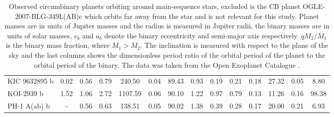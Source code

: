 \documentclass[twoside,openright,titlepage,numbers=noenddot,headinclude,%
                footinclude=true,cleardoublepage=empty,abstractoff, 
                BCOR=5mm,paper=a4,fontsize=11pt,%
                american,%
                ]{scrreprt}%
\begin{document}
\begin{table}
\begin{tabular}{lccccccccccccc}
    KIC 9632895 b    &  0.02 &  0.56 &  0.79 &   240.50 &  0.04 &  89.43 &    0.93 &    0.19 &  0.21 &      0.18 &     27.32 &      0.05 &       8.80 \\
    KOI-2939 b       &  1.52 &  1.06 &  2.72 &  1107.59 &  0.06 &  90.10 &    1.22 &    0.97 &  0.79 &      0.13 &     11.26 &      0.16 &      98.38 \\
    PH-1 A(ab) b     &   - &  0.56 &  0.63 &   138.51 &  0.05 &  90.02 &    1.38 &    0.39 &  0.28 &      0.17 &     20.00 &      0.21 &       6.93 \\
\bottomrule
\end{tabular}\caption[Observed circumbinary planets orbiting MS stars.]{Observed 
    circumbinary planets orbiting around main-sequence
    stars, excluded is the CB planet OGLE-2007-BLG-349L(AB)c which orbits far away from the star 
    and 
    is not relevant for this study. Planet masses are in units of Jupiter masses and the radius is measured
    in Jupiter radii, the binary masses are in units of solar masses, $e_b$ and
    $a_b$ denote the binary eccentricity and semi-major axis respectively. $qM_2/M_1$ is the 
    binary mass fraction, where $M_1>M_2$. The inclination is measured with
    respect to the plane of the sky and the last columns shows the dimensionless 
    period ratio of the orbital period of the planet to the orbital period of the
    binary. The data was taken from the Open Exoplanet Catalogue \citep{catalogue}.}
\label{table:kepler_planets}
\end{table}
\end{document}
